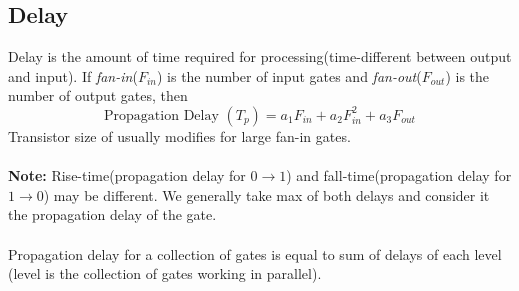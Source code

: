 \documentclass[oneside]{book}
\begin{document}
\subsection{Delay}
Delay is the amount of time required for processing(time-different between output and input). If \textit{fan-in}(\(F_{in}\)) is the number of input gates and \textit{fan-out}(\(F_{out}\)) is the number of output gates, then
\[
	\text{Propagation Delay } (T_p) = a_1F_{in} + a_2F_{in}^2 + a_3F_{out}
\]
Transistor size of usually modifies for large fan-in gates.
\\\\
\noindent\textbf{Note: } Rise-time(propagation delay for \(0 \to 1\)) and fall-time(propagation delay for \(1 \to 0\)) may be different. We generally take max of both delays and consider it the propagation delay of the gate.
\\\\
\noindent Propagation delay for a collection of gates is equal to sum of delays of each level (level is the collection of gates working in parallel).



\end{document}
